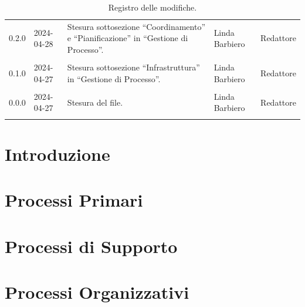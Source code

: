 \documentclass[8pt]{article}
\newcommand{\signatureline}[1]{%
	 \par\vspace{0.5cm}
	\noindent\makebox[\linewidth][r]{\rule{0.2\textwidth}{0.5pt}\hspace{3cm}\makebox[0pt][r]{\vspace{3pt}\footnotesize #1}}%
}
\begin{document}
\begin{table}[ht!]
\begin{tabular}{p{1.2cm} p{2cm} p{6cm} p{3cm} p{2cm}}
		0.2.0 & 2024-04-28 & Stesura sottosezione ``Coordinamento'' e ``Pianificazione'' in ``Gestione di Processo''. & Linda Barbiero & Redattore \\\\ %
		0.1.0 & 2024-04-27 & Stesura sottosezione ``Infrastruttura'' in ``Gestione di Processo''. & Linda Barbiero & Redattore \\\\ %
		0.0.0 & 2024-04-27 & Stesura del file. & Linda Barbiero & Redattore \\\\ %
		\bottomrule
	\end{tabular}
	\caption{Registro delle modifiche.}
	\label{table:Registro delle modifiche}
\end{table}
\newpage
\tableofcontents
\clearpage
\newpage
\justifying
\justifying
\section{Introduzione} \label{sec:intro}

\section{Processi Primari} \label{sec:processi_primari}

\section{Processi di Supporto} \label{sec:processi_supporto}

\section{Processi Organizzativi} \label{sec:processi_organizzativi}

\newpage

\end{document}
